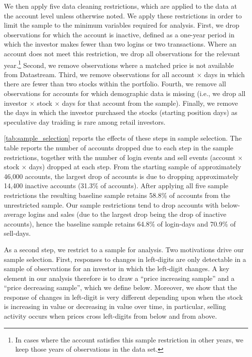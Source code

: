 We then apply five data cleaning restrictions, which are applied to the data at the account level unless otherwise noted. We apply these restrictions in order to limit the sample to the minimum variables required for analysis. First, we drop observations for which the account is inactive, defined as a one-year period in which the investor makes fewer than two logins or two transactions. Where an account does not meet this restriction, we drop all observations for the relevant year.\footnote{In cases where the account satisfies this sample restriction in other years, we keep those years of observations in the data set.} Second, we remove observations where a matched price is not available from Datastream. Third, we remove observations for all account $\times$ days in which there are fewer than two stocks within the portfolio.  Fourth, we remove all observations for accounts for which demographic data is missing (i.e., we drop all investor $\times$ stock $\times$ days for that account from the sample). Finally, we remove the days in which the investor purchased the stocks (starting position days) as speculative day traiding is rare among retail investors. 

\ref{tab:sample_selection} reports the effects of these steps in sample selection. The table reports the number of accounts dropped due to each step in the sample restrictions, together with the number of login events and sell events (account $\times$ stock $\times$ days) dropped at each step. From the starting sample of approximately 46,000 accounts, the largest drop of accounts is due to dropping approximately 14,400 inactive accounts (31.3\% of accounts). After applying all five sample restrictions the resulting baseline sample retains 58.8\% of accounts from the unrestricted sample. Our sample restrictions tend to drop accounts with below-average logins and sales (due to the largest drop being the drop of inactive accounts), hence the baseline sample retains 64.8\% of login-days and 70.9\% of sell-days. 

As a second step, we restrict to a sample for analysis. Two motivations drive our sample selection. First, responses to changes in left-digits are only detectable in a sample of observations for an investor in which the left-digit changes.  A key element in our analysis therefore is to draw a ``price increasing sample'' and a ``price decreasing sample'', which we define below. Moreover, we show that the response of changes in left-digit is very different depending upon when the stock is increasing in value or decreasing in value over time, in particular, selling activity occurs when prices cross left-digits from below and from above.

